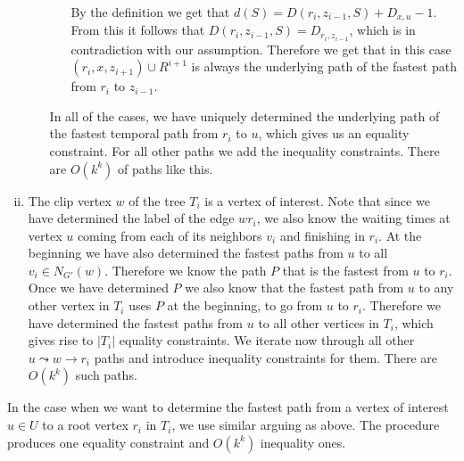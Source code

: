 \documentclass[11pt,a4paper]{article}
\theoremstyle{remark}
\theoremstyle{definition}
\begin{document}
\begin{enumerate}[(i)]
\begin{enumerate}[(a)]
\begin{itemize}
            By the definition we get that $d(S) = D(r_i,z_{i-1},S) + D_{x,u} - 1$.
            From this it follows that $D(r_i,z_{i-1},S) = D_{r_i, z_{i-1}}$, which is in contradiction with our assumption.
            Therefore we get that in this case 
            $(r_i, x, z_{i+1}) \cup R^{i+1}$ is always the underlying path of the fastest path from $r_i$ to $z_{i-1}$.
        \end{itemize}
       In all of the cases, we have uniquely determined the underlying path of the fastest temporal path from $r_i$ to $u$,
       which gives us an equality constraint.
       For all other paths we add the inequality constraints. 
       There are $O(k^k)$ of paths like this.
    \end{enumerate}
    
    \item The clip vertex $w$ of the tree $T_i$ is a vertex of interest.
    Note that since we have determined the label of the edge $w r_i$, we also know the waiting times 
    at vertex $u$ coming from each of its neighbors $v_i$ and finishing in $r_i$. 
    At the beginning we have also determined the fastest paths from $u$ to all $v_i \in N_{G'}(w)$.
    Therefore we know the path $P$ that is the fastest from $u$ to $r_i$. 
    Once we have determined $P$ we also know that the fastest path from $u$ to any other vertex in $T_i$ uses $P$ at the beginning, to go from $u$ to $r_i$.
    Therefore we have determined the fastest paths from $u$ to all other vertices in $T_i$,
    which gives rise to $|T_i|$ equality constraints.
    We iterate now through all other $u \leadsto w \rightarrow r_i$ paths and introduce inequality constraints for them. 
    There are $O(k^k)$ such paths.
\end{enumerate}

In the case when we want to determine the fastest path from a vertex of interest $u \in U$ to a root vertex $r_i$ in $T_i$,
we use similar arguing as above.
The procedure produces one equality constraint and $O(k^k)$ inequality ones.
\end{document}
